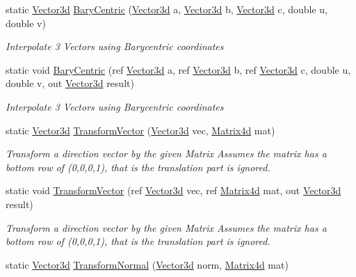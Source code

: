 \begin{DoxyCompactItemize}
static \hyperlink{struct_open_t_k_1_1_vector3d}{Vector3d} \hyperlink{struct_open_t_k_1_1_vector3d_a75358f7bb6fd68ec708d084fa36c0663}{Bary\-Centric} (\hyperlink{struct_open_t_k_1_1_vector3d}{Vector3d} a, \hyperlink{struct_open_t_k_1_1_vector3d}{Vector3d} b, \hyperlink{struct_open_t_k_1_1_vector3d}{Vector3d} c, double u, double v)
\begin{DoxyCompactList}\small\item\em Interpolate 3 Vectors using Barycentric coordinates \end{DoxyCompactList}\item 
static void \hyperlink{struct_open_t_k_1_1_vector3d_a48a0c572c01d771d5903661242d25672}{Bary\-Centric} (ref \hyperlink{struct_open_t_k_1_1_vector3d}{Vector3d} a, ref \hyperlink{struct_open_t_k_1_1_vector3d}{Vector3d} b, ref \hyperlink{struct_open_t_k_1_1_vector3d}{Vector3d} c, double u, double v, out \hyperlink{struct_open_t_k_1_1_vector3d}{Vector3d} result)
\begin{DoxyCompactList}\small\item\em Interpolate 3 Vectors using Barycentric coordinates\end{DoxyCompactList}\item 
static \hyperlink{struct_open_t_k_1_1_vector3d}{Vector3d} \hyperlink{struct_open_t_k_1_1_vector3d_a2f33e9f148b468ed15a70f40ac948fe7}{Transform\-Vector} (\hyperlink{struct_open_t_k_1_1_vector3d}{Vector3d} vec, \hyperlink{struct_open_t_k_1_1_matrix4d}{Matrix4d} mat)
\begin{DoxyCompactList}\small\item\em Transform a direction vector by the given Matrix Assumes the matrix has a bottom row of (0,0,0,1), that is the translation part is ignored. \end{DoxyCompactList}\item 
static void \hyperlink{struct_open_t_k_1_1_vector3d_aaa12b4d37c1de0624670ebf8aeb39811}{Transform\-Vector} (ref \hyperlink{struct_open_t_k_1_1_vector3d}{Vector3d} vec, ref \hyperlink{struct_open_t_k_1_1_matrix4d}{Matrix4d} mat, out \hyperlink{struct_open_t_k_1_1_vector3d}{Vector3d} result)
\begin{DoxyCompactList}\small\item\em Transform a direction vector by the given Matrix Assumes the matrix has a bottom row of (0,0,0,1), that is the translation part is ignored. \end{DoxyCompactList}\item 
static \hyperlink{struct_open_t_k_1_1_vector3d}{Vector3d} \hyperlink{struct_open_t_k_1_1_vector3d_a5788e03915793e548f9a63496d2b4e40}{Transform\-Normal} (\hyperlink{struct_open_t_k_1_1_vector3d}{Vector3d} norm, \hyperlink{struct_open_t_k_1_1_matrix4d}{Matrix4d} mat)

\end{DoxyCompactItemize}
